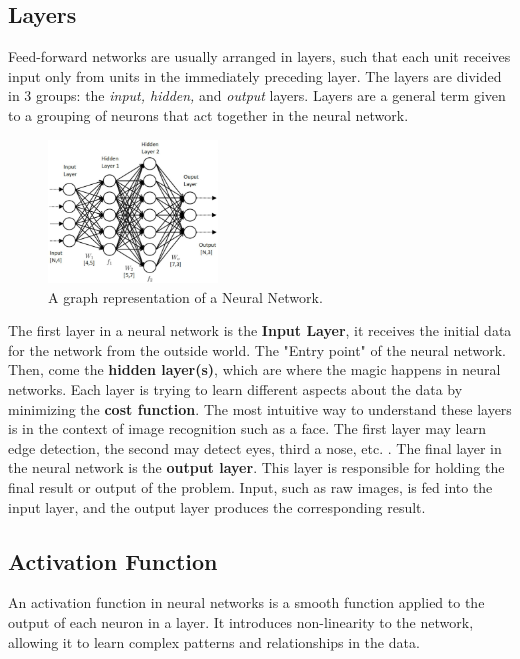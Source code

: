 \documentclass{article}
\begin{document}
\subsection{Layers}
\label{sub:Layers}
Feed-forward networks are usually arranged in layers, such that each unit receives input
only from units in the immediately preceding layer. The layers are divided in 3 groups: the \textit{input, hidden,} and \textit{output} layers. Layers are a general term given to a grouping of neurons that act together in the neural network.
  \begin{figure} %
    \centering
    \includegraphics[width=0.4\textwidth]{NeuralNetwork}
    \caption{A graph representation of a Neural Network.}
\end{figure}

The first layer in a neural network is the \textbf{Input Layer}, it receives the initial data for the network from the outside world. The "Entry point" of the neural network. Then, come the \textbf{hidden layer(s)}, which are where the magic happens in neural networks. Each layer is trying to learn different aspects about the data by minimizing the \textbf{cost function}. The most intuitive way to understand these layers is in the context of image recognition such as a face. The first layer may learn edge detection, the second may detect eyes, third a nose, etc. \citep{layers}. The final layer in the neural network is the \textbf{output layer}. This layer is responsible for holding the final result or output of the problem. Input, such as raw images, is fed into the input layer, and the output layer produces the corresponding result.


\subsection{Activation Function}%
  \label{sub:ActivationFunction}
An activation function in neural networks is a smooth function applied to the output of each neuron in a layer. It introduces non-linearity to the network, allowing it to learn complex patterns and relationships in the data.
\end{document}
